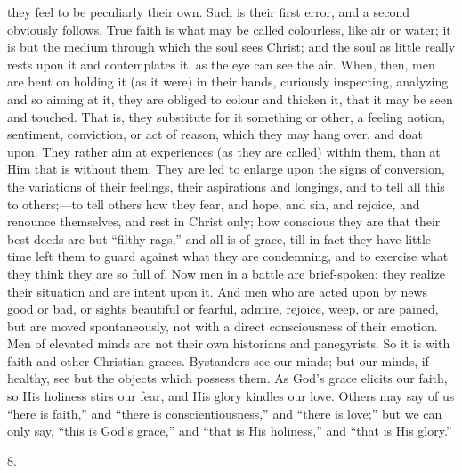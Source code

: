 they feel to be peculiarly their own. Such is their first error, and a
second obviously follows. True faith is what may be called colourless,
like air or water; it is but the medium through which the soul sees
Christ; and the soul as little really rests upon it and contemplates
it, as the eye can see the air. When, then, men are bent on holding it
(as it were) in their hands, curiously inspecting, analyzing, and so
aiming at it, they are obliged to colour and thicken it, that it may
be seen and touched. That is, they substitute for it something or
other, a feeling notion, sentiment, conviction, or act of reason,
which they may hang over, and doat upon. They rather aim at
experiences (as they are called) within them, than at Him that is
without them. They are led to enlarge upon the signs of conversion,
the variations of their feelings, their aspirations and longings, and
to tell all this to others;—to tell others how they fear, and hope,
and sin, and rejoice, and renounce themselves, and rest in Christ
only; how conscious they are that their best deeds are but
``filthy rags,'' and all is of grace, till in fact they have
little time left them to guard against what they are condemning,
and to exercise what they think they are so full of. Now men in a
battle are brief-spoken; they realize their situation and are intent
upon it. And men who are acted upon by news good or bad, or sights
beautiful or fearful, admire, rejoice, weep, or are pained, but are
moved spontaneously, not with a direct consciousness of their emotion.
Men of elevated minds are not their own historians and panegyrists. So
it is with faith and other Christian graces. Bystanders see our minds;
but our minds, if healthy, see but the objects which possess them. As
God's grace elicits our faith, so His holiness stirs our fear, and His
glory kindles our love. Others may say of us ``here is
faith,'' and ``there is conscientiousness,'' and
``there is love;'' but we can only say, ``this is God's
grace,'' and ``that is His holiness,'' and ``that is
His glory.''

8.


